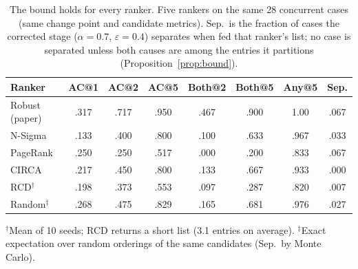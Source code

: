 \begin{table}[t]
\centering\footnotesize
\setlength{\tabcolsep}{3.2pt}
\caption{The bound holds for every ranker. Five rankers on the same 28 concurrent cases (same change point and candidate metrics). Sep.\ is the fraction of cases the corrected stage ($\alpha{=}0.7$, $\varepsilon{=}0.4$) separates when fed that ranker's list; no case is separated unless both causes are among the entries it partitions (Proposition~\ref{prop:bound}).}
\label{tab:rankers}
\begin{tabular}{@{}lccccccc@{}}
\toprule
\textbf{Ranker} & \textbf{AC@1} & \textbf{AC@2} & \textbf{AC@5} & \textbf{Both@2} & \textbf{Both@5} & \textbf{Any@5} & \textbf{Sep.}\\
\midrule
Robust (paper) & .317 & .717 & .950 & .467 & .900 & 1.00 & .067 \\
N-Sigma & .133 & .400 & .800 & .100 & .633 & .967 & .033 \\
PageRank & .250 & .250 & .517 & .000 & .200 & .833 & .067 \\
CIRCA & .217 & .450 & .800 & .133 & .667 & .933 & .000 \\
RCD$^{\dagger}$ & .198 & .373 & .553 & .097 & .287 & .820 & .007 \\
\midrule
Random$^{\ddagger}$ & .268 & .475 & .829 & .165 & .681 & .976 & .027 \\
\bottomrule
\end{tabular}
\par\smallskip\raggedright\scriptsize $^{\dagger}$Mean of 10 seeds; RCD returns a short list (3.1 entries on average). $^{\ddagger}$Exact expectation over random orderings of the same candidates (Sep.\ by Monte Carlo).
\end{table}
